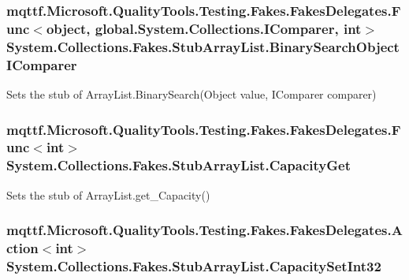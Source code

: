 \hypertarget{class_system_1_1_collections_1_1_fakes_1_1_stub_array_list_a1bd8fea5f13788bba349b99915ad3ddf}{
\subsubsection[{Binary\-Search\-Object\-I\-Comparer}]{\setlength{\rightskip}{0pt plus 5cm}mqttf.\-Microsoft.\-Quality\-Tools.\-Testing.\-Fakes.\-Fakes\-Delegates.\-Func$<$object, global.\-System.\-Collections.\-I\-Comparer, int$>$ System.\-Collections.\-Fakes.\-Stub\-Array\-List.\-Binary\-Search\-Object\-I\-Comparer}}\label{class_system_1_1_collections_1_1_fakes_1_1_stub_array_list_a1bd8fea5f13788bba349b99915ad3ddf}


Sets the stub of Array\-List.\-Binary\-Search(\-Object value, I\-Comparer comparer)

\hypertarget{class_system_1_1_collections_1_1_fakes_1_1_stub_array_list_a19c38a73cf7b7252b9321dd1eb1d86c5}{
\subsubsection[{Capacity\-Get}]{\setlength{\rightskip}{0pt plus 5cm}mqttf.\-Microsoft.\-Quality\-Tools.\-Testing.\-Fakes.\-Fakes\-Delegates.\-Func$<$int$>$ System.\-Collections.\-Fakes.\-Stub\-Array\-List.\-Capacity\-Get}}\label{class_system_1_1_collections_1_1_fakes_1_1_stub_array_list_a19c38a73cf7b7252b9321dd1eb1d86c5}


Sets the stub of Array\-List.\-get\-\_\-\-Capacity()

\hypertarget{class_system_1_1_collections_1_1_fakes_1_1_stub_array_list_acfa30a51deb6c7e97c05b38edd4be087}{
\subsubsection[{Capacity\-Set\-Int32}]{\setlength{\rightskip}{0pt plus 5cm}mqttf.\-Microsoft.\-Quality\-Tools.\-Testing.\-Fakes.\-Fakes\-Delegates.\-Action$<$int$>$ System.\-Collections.\-Fakes.\-Stub\-Array\-List.\-Capacity\-Set\-Int32}}\label{class_system_1_1_collections_1_1_fakes_1_1_stub_array_list_acfa30a51deb6c7e97c05b38edd4be087}


